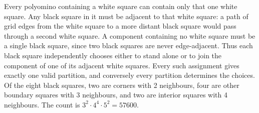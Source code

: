 Every polyomino containing a white square can contain only that one white square. Any black square in it must be adjacent to that white square: a path of grid edges from the white square to a more distant black square would pass through a second white square. A component containing no white square must be a single black square, since two black squares are never edge-adjacent. Thus each black square independently chooses either to stand alone or to join the component of one of its adjacent white squares. Every such assignment gives exactly one valid partition, and conversely every partition determines the choices. Of the eight black squares, two are corners with 2 neighbours, four are other boundary squares with 3 neighbours, and two are interior squares with 4 neighbours. The count is $\boxed{3^2\cdot4^4\cdot5^2=57600}$.

